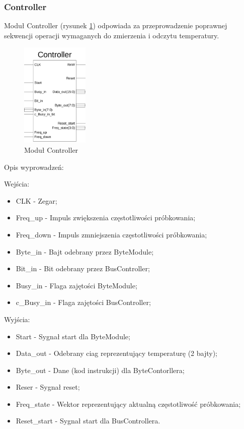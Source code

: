 \documentclass[a4paper]{article}
\begin{document}
\subsubsection{Controller}


Moduł Controller (rysunek \ref{controller_sym}) odpowiada za przeprowadzenie poprawnej sekwencji operacji wymaganych do zmierzenia i odczytu temperatury.

\begin{figure}[H]
\begin{center}
\includegraphics[height=5cm]{graphics/controller_sym.png}
\end{center}
\caption{Moduł Controller}
\label{controller_sym}
\end{figure}

Opis wyprowadzeń:

Wejścia:
\begin{itemize}
\item CLK - Zegar;
\item Freq\_up - Impuls zwiększenia częstotliwości próbkowania;
\item Freq\_down - Impuls zmniejszenia częstotliwości próbkowania;
\item Byte\_in - Bajt odebrany przez ByteModule;
\item Bit\_in - Bit odebrany przez BusController;
\item Busy\_in - Flaga zajętości ByteModule;
\item c\_Busy\_in - Flaga zajętości BusController;
\end{itemize}

Wyjścia:
\begin{itemize}
\item Start - Sygnał start dla ByteModule;
\item Data\_out - Odebrany ciag reprezentujący temperaturę (2 bajty);
\item Byte\_out - Dane (kod instrukcji) dla ByteContorllera;
\item Reser - Sygnał reset;
\item Freq\_state - Wektor reprezentujący aktualną częstotliwość próbkowania;
\item Reset\_start - Sygnał start dla BusControllera. 
\end{itemize}
\end{document}
